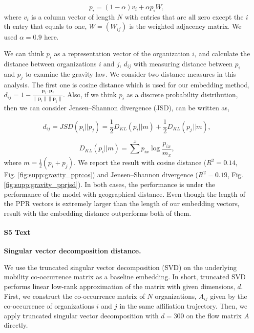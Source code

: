 \documentclass[12pt]{article} %
\begin{document}
\begin{equation}
	\label{eq:ppr}
	p_i = (1 - \alpha) v_i + \alpha p_i W,
\end{equation}
where $v_i$ is a column vector of length $N$ with entries that are all zero except the $i$th entry that equals to one, $W = (W_{ij})$ is the weighted adjacency matrix. We used $\alpha=0.9$ here.

 We can think $p_i$ as a representation vector of the organization $i$, and calculate the distance between organizations $i$ and $j$, $d_{ij}$ with measuring distance between $p_i$ and $p_j$ to examine the gravity law. We consider two distance measures in this analysis. The first one is cosine distance which is used for our embedding method, $d_{ij} = 1 - \frac{\bm{p}_{i} \cdot \bm{p}_{j}}{\lVert \bm{p}_{i} \rVert \lVert \bm{p}_{j} \rVert}$. Also, if we think $p_i$ as a discrete probability distribution, then we can consider Jensen–Shannon divergence (JSD), can be written as,

\begin{equation}
	\label{eq:JSD}
	d_{ij} = JSD(p_i||p_j) = \frac{1}{2}D_{KL}(p_i||m) + \frac{1}{2}D_{KL}(p_j||m),
\end{equation}

\begin{equation}
	\label{eq:KL}
	D_{KL}(p_i||m) = \sum^x p_{ix}\log\frac{p_{ix}}{m_x},
\end{equation}
where $m=\frac{1}{2}(p_i+p_j)$. We report the result with cosine distance ($R^2=0.14$, Fig. \ref{fig:supp:gravity_pprcos}) and  Jensen–Shannon divergence ($R^2=0.19$, Fig. \ref{fig:supp:gravity_pprjsd}). In both cases, the performance is under the performance of the model with geographical distance. Even though the length of the PPR vectors is extremely larger than the length of our embedding vectors, result with the embedding distance outperforms both of them. 


%
\paragraph*{S5 Text}
\label{si:text:Raw SVD}
{\bf Singular vector decomposition distance.}

We use the truncated singular vector decomposition (SVD) on the underlying mobility co-occurrence matrix as a baseline embedding. 
In short, truncated SVD performs linear low-rank approximation of the matrix with given dimensions, $d$.
First, we construct the co-occurrence matrix of $N$ organizations, $A_{ij}$ given by the co-occurrence of organizations $i$ and $j$ in the same affiliation trajectory. 
Then, we apply truncated singular vector decomposition with $d=300$ on the flow matrix $A$ directly.
\end{document}
